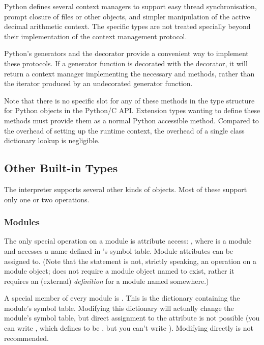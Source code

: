 Python defines several context managers to support easy thread
synchronisation, prompt closure of files or other objects, and
simpler manipulation of the active decimal arithmetic
context. The specific types are not treated specially beyond
their implementation of the context management protocol.

Python's generators and the  decorator
provide a convenient way to implement these protocols.  If a generator
function is decorated with the 
decorator, it will return a context manager implementing the necessary
 and  methods, rather than the
iterator produced by an undecorated generator function.

Note that there is no specific slot for any of these methods in the
type structure for Python objects in the Python/C API. Extension
types wanting to define these methods must provide them as a normal
Python accessible method. Compared to the overhead of setting up the
runtime context, the overhead of a single class dictionary lookup
is negligible.


\subsection{Other Built-in Types \label{typesother}}

The interpreter supports several other kinds of objects.
Most of these support only one or two operations.


\subsubsection{Modules \label{typesmodules}}

The only special operation on a module is attribute access:
, where  is a module and 
accesses a name defined in 's symbol table.  Module attributes
can be assigned to.  (Note that the  statement is not,
strictly speaking, an operation on a module object;  does not require a module object named  to exist,
rather it requires an (external) \emph{definition} for a module named
 somewhere.)

A special member of every module is .
This is the dictionary containing the module's symbol table.
Modifying this dictionary will actually change the module's symbol
table, but direct assignment to the  attribute is not
possible (you can write , which
defines  to be , but you can't write
).  Modifying  directly
is not recommended.


